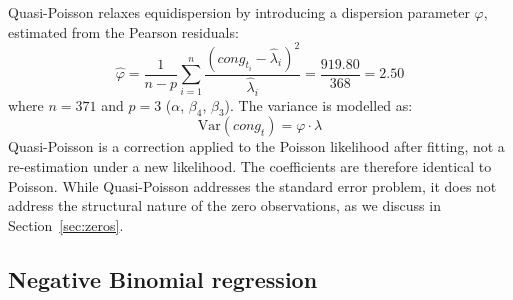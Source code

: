 \documentclass[11pt]{article}
\begin{document}
Quasi-Poisson \citep{McCullagh1989} relaxes equidispersion by introducing a dispersion parameter $\varphi$, estimated from the Pearson residuals:
\begin{equation}
  \hat{\varphi}
    = \frac{1}{n-p}
      \sum_{i=1}^{n}
      \frac{(\mathit{cong}_{t_i} - \hat{\lambda}_i)^{2}}
           {\hat{\lambda}_i}
    = \frac{919.80}{368} = 2.50
  \label{eq:phi}
\end{equation}
where $n = 371$ and $p = 3$ ($\alpha$, $\beta_4$, $\beta_3$). The
variance is modelled as:
\begin{equation}
  \mathrm{Var}(\mathit{cong}_t) = \varphi \cdot \lambda
  \label{eq:qp_var}
\end{equation}
Quasi-Poisson is a correction applied to the Poisson likelihood after fitting, not a re-estimation under a new likelihood. The coefficients are therefore identical to Poisson. While Quasi-Poisson addresses the
standard error problem, it does not address the structural nature of the zero observations, as we discuss in Section~\ref{sec:zeros}.

\subsection{Negative Binomial regression}
\end{document}
